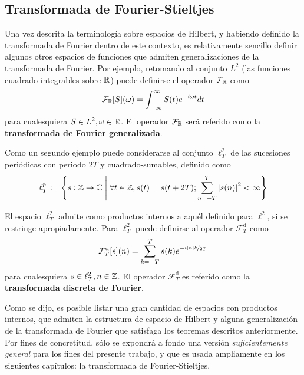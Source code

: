 \subsection{Transformada de Fourier-Stieltjes}

Una vez descrita la terminología sobre espacios de Hilbert, y habiendo definido la transformada de Fourier dentro de este contexto, es relativamente sencillo definir algunos otros espacios de funciones que admiten generalizaciones de la transformada de Fourier.
%
Por ejemplo, retomando al conjunto $L^{2}$  (las funciones cuadrado-integrables sobre $\mathbb{R}$) puede definirse el operador $\mathcal{F}_{\mathbb{R}}$ como
\begin{equation}
\mathcal{F}_{\mathbb{R}}[S](\omega) = \int_{-\infty}^{\infty} S(t) e^{-{ i \omega t}} dt
\end{equation}
para cualesquiera $S \in L^{2}, \omega \in \mathbb{R}$. El operador $\mathcal{F}_{\mathbb{R}}$ será referido como la \textbf{transformada de Fourier generalizada}.

Como un segundo ejemplo puede considerarse al conjunto $\ell^{2}_T$ de las sucesiones periódicas con periodo $2T$ y cuadrado-sumables, definido como
\begin{equation}
\ell^{p}_T := \left\{ s: \mathbb{Z}\rightarrow\mathbb{C} \mathrel{}\middle|\mathrel{} \forall t\in \mathbb{Z}, s(t) = s(t+2T) ; \sum_{n=-T}^{T} \left| s(n) \right|^{2} < \infty \right\}
\end{equation}

El espacio $\ell^{2}_T$ admite como productos internos a aquél definido para $\ell^{2}$, si se restringe apropiadamente.
%
Para $\ell^{2}_T$ puede definirse al operador $\mathcal{F}_T^{\text{d}}$ como
\begin{equation}
\mathcal{F}_T^{\text{d}}[s](n) = \sum_{k=-T}^{T} s(k) e^{-\nicefrac{ i \left| n \right| k}{2T}}
\end{equation}
para cualesquiera $s \in \ell^{2}_T, n \in \mathbb{Z}$. El operador $\mathcal{F}_T^{\text{d}}$ es referido como la \textbf{transformada discreta de Fourier}.

Como se dijo, es posible listar una gran cantidad de espacios con productos internos, que admiten la estructura de espacio de Hilbert y alguna generalización de la transformada de Fourier que satisfaga los teoremas descritos anteriormente.
%
Por fines de concretitud, sólo se expondrá a fondo una versión \textit{suficientemente general} para los fines del presente trabajo, y que es usada ampliamente en los siguientes capítulos: la transformada de Fourier-Stieltjes.

